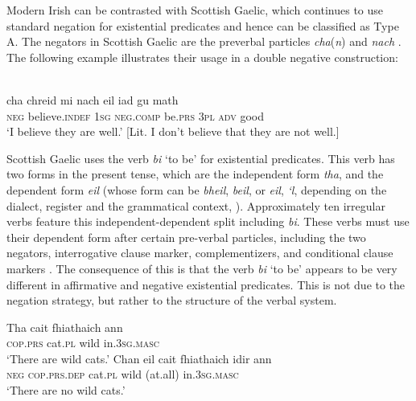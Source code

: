 ﻿\documentclass[output=paper]{langsci/langscibook}
\begin{document}
Modern Irish can be contrasted with Scottish
Gaelic, which continues to use standard negation for
existential predicates and hence can be classified as Type A. The negators
in Scottish Gaelic are the preverbal particles \textit{cha}(\textit{n}) and \textit{nach} \citep[61]{Lamb2001}. The following example illustrates their usage in a double negative construction:
%
\begin{exe}\ex
{}\\
    \gll cha  chreid mi nach eil iad gu    math \\
\textsc{neg} believe.\textsc{indef} \textsc{1sg} \textsc{neg}.\textsc{comp} be.\textsc{prs} \textsc{3pl} \textsc{adv} good \\
    \glt `I believe they are well.' [Lit. I don’t believe that they are not well.] 
    \end{exe}
%
Scottish Gaelic uses the verb \textit{bi} `to be' for existential
predicates. This verb has two forms in the present tense, which are the
independent form \textit{tha}, and the dependent form \textit{eil} (whose
form can be \textit{bheil}, \textit{beil}, or \textit{eil}, \textit{‘l},
depending on the dialect, register and the grammatical context,
\citealt[54]{Lamb2001}). Approximately ten irregular verbs feature this independent-dependent split including \textit{bi}.  These verbs must use their dependent form after certain pre-verbal particles, including the two negators, interrogative clause marker, complementizers, and conditional clause markers \citep[50]{Lamb2001}. The consequence of this is that the verb \textit{bi} `to be' appears to be very different in affirmative and negative existential predicates. This is not due to the negation strategy, but rather to the structure of the verbal system.
%
\begin{exe}\ex
{}
\begin{xlist}
\ex\gll Tha cait fhiathaich ann \\
\textsc{cop}.\textsc{prs} cat.\textsc{pl} wild in.\textsc{3sg.masc} \\
    \glt `There are wild cats.'
\ex\gll Chan eil cait fhiathaich \op{}idir\cp{}   ann\\
    \textsc{neg} \textsc{cop.prs.dep} cat.\textsc{pl} wild (at.all)
    in.\textsc{3sg.masc}\\
    \glt `There are no wild cats.'
\end{xlist}\end{exe}
\end{document}
